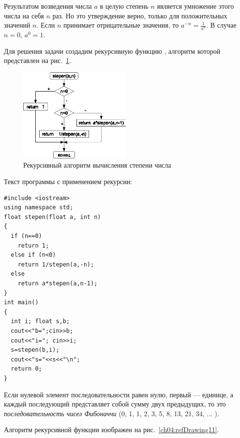 
Результатом возведения числа $a$ в целую степень $n$ является умножение этого числа
на себя $n$ раз. Но это утверждение верно, только для положительных значений $n$.
Если $n$ принимает отрицательные значения, то  $a^{-n}=\frac{1}{a^n}$. В случае
$n=0$,  $a^0=1$.

Для решения задачи создадим рекурсивную функцию , алгоритм которой 
представлен на рис.~\ref{ch04:refDrawing10}. 

\begin{figure}[htb]
\begin{center}
\includegraphics[width=0.5\textwidth]{img/ris_4_11}
\caption{Рекурсивный алгоритм вычисления степени числа}
\label{ch04:refDrawing10}
\end{center}
\end{figure}

Текст программы с применением рекурсии:
\begin{lstlisting}
#include <iostream> 
using namespace std;
float stepen(float a, int n) 
{
  if (n==0)
    return 1;
  else if (n<0) 
    return 1/stepen(a,-n); 
  else
    return a*stepen(a,n-1); 
}
int main()
{
  int i; float s,b;
  cout<<"b=";cin>>b;
  cout<<"i="; cin>>i;
  s=stepen(b,i);
  cout<<"s="<<s<<"\n"; 
  return 0;
}
\end{lstlisting}


Если нулевой элемент последовательности равен нулю, первый --- единице, а каждый последующий представляет собой сумму двух
предыдущих, то это \emph{последовательность чисел Фибоначчи} (0, 1, 1, 2, 3, 5, 8, 13, 21, 34, ... ). 

Алгоритм рекурсивной функции  изображен на рис.~\ref{ch04:refDrawing11}.

